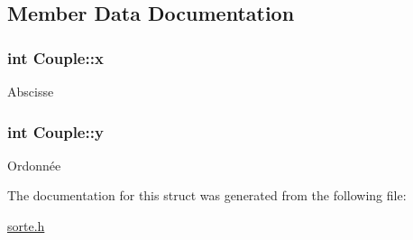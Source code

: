 \subsection{Member Data Documentation}
\hypertarget{structCouple_ad26b1b2b38e272d15d513642cf158a74}{
\subsubsection[{x}]{\setlength{\rightskip}{0pt plus 5cm}int {\bf Couple::x}}}
\label{structCouple_ad26b1b2b38e272d15d513642cf158a74}
Abscisse \hypertarget{structCouple_a38b6e923a0b1c97433ccb9251f2006fa}{
\subsubsection[{y}]{\setlength{\rightskip}{0pt plus 5cm}int {\bf Couple::y}}}
\label{structCouple_a38b6e923a0b1c97433ccb9251f2006fa}
Ordonnée 

The documentation for this struct was generated from the following file:\begin{DoxyCompactItemize}
\item 
\hyperlink{sorte_8h}{sorte.h}\end{DoxyCompactItemize}
